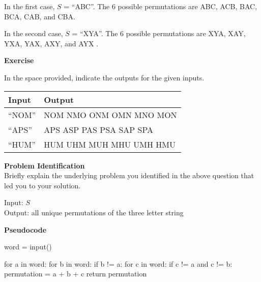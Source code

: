 \documentclass[a4paper]{exam}
\newcommand\heading[1]{\textbf{#1}}
\begin{document}
\begin{questions}
  In the first case, $S$ = ``ABC''. The 6 possible permutations are ABC, ACB, BAC, BCA, CAB, and CBA.

  In the second case, $S$ = ``XYA''. The 6 possible permutations are XYA, XAY, YXA, YAX, AXY, and AYX .

  \heading{Exercise}

  In the space provided, indicate the outputs for the given inputs.

  \begin{tabularx}{\textwidth}{|X|X|}
    \rowcolor{gray!50}
    \hline
    Input  & Output \\ \hline\hline
    ``NOM''   &  NOM NMO ONM OMN MNO MON       \\\hline
    ``APS'' &   APS ASP PAS PSA SAP SPA     \\\hline
    ``HUM''  &  HUM UHM MUH MHU UMH HMU      \\\hline
  \end{tabularx}

  \heading{Problem Identification}\\
  Briefly explain the underlying problem you identified in the above question that led you to your solution.

  \begin{mdframed}
    Input: $S$ \\
    Output: all unique permutations of the three letter string
  \end{mdframed}

  \heading{Pseudocode}
  \begin{python}
word = input()

for a in word:
    for b in word:
        if b != a:
            for c in word:
                if c != a and c != b:
                    permutation = a + b + c
                    return permutation


\end{python}
\end{questions}
\end{document}

